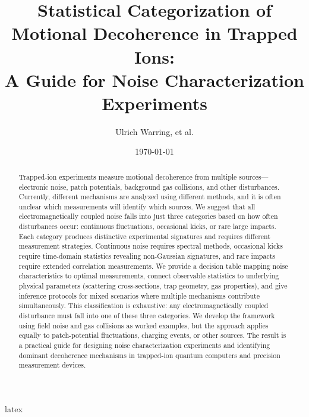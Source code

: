 \documentclass[11pt,a4paper]{article}
\title{Statistical Categorization of Motional Decoherence in Trapped Ions: \\
A Guide for Noise Characterization Experiments}
\author[1]{Ulrich Warring, et al.}
\affil[1]{Physikalisches Institut, Universität Freiburg, Germany}
\date{\today}
\begin{document}
\maketitle

latex\begin{abstract}
Trapped-ion experiments measure motional decoherence from multiple sources—electronic noise, patch potentials, background gas collisions, and other disturbances. 
Currently, different mechanisms are analyzed using different methods, and it is often unclear which measurements will identify which sources.
We suggest that all electromagnetically coupled noise falls into just three categories based on how often disturbances occur: continuous fluctuations, occasional kicks, or rare large impacts.
Each category produces distinctive experimental signatures and requires different measurement strategies.
Continuous noise requires spectral methods, occasional kicks require time-domain statistics revealing non-Gaussian signatures, and rare impacts require extended correlation measurements.
We provide a decision table mapping noise characteristics to optimal measurements, connect observable statistics to underlying physical parameters (scattering cross-sections, trap geometry, gas properties), and give inference protocols for mixed scenarios where multiple mechanisms contribute simultaneously.
This classification is exhaustive: any electromagnetically coupled disturbance must fall into one of these three categories.
We develop the framework using field noise and gas collisions as worked examples, but the approach applies equally to patch-potential fluctuations, charging events, or other sources.
The result is a practical guide for designing noise characterization experiments and identifying dominant decoherence mechanisms in trapped-ion quantum computers and precision measurement devices.
\end{abstract}















\end{document}
